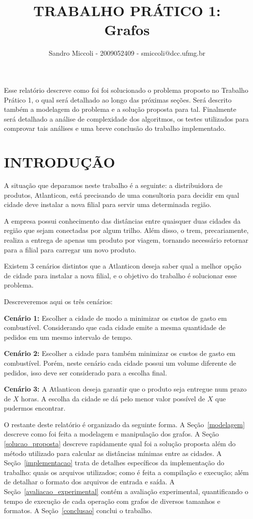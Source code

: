 \documentclass[12pt]{article}
\title{TRABALHO PRÁTICO 1: \\ Grafos}
\author{Sandro Miccoli - 2009052409 - smiccoli@dcc.ufmg.br}
\begin{document}
\maketitle

\begin{resumo}
Esse relatório descreve como foi foi solucionado o problema proposto no Trabalho Prático 1, o qual será detalhado ao longo das próximas seções. Será descrito também a modelagem do problema e a solução proposta para tal. Finalmente será detalhado a análise de complexidade dos algoritmos, os testes utilizados para comprovar tais análises e uma breve conclusão do trabalho implementado.
\end{resumo}

\section{INTRODUÇÃO}

	A situação que deparamos neste trabalho é a seguinte: a distribuidora de produtos, Atlanticon, está precisando de uma consultoria para decidir em qual cidade deve instalar a nova filial para servir uma determinada região.

	A empresa possui conhecimento das distâncias entre quaisquer duas cidades da região que sejam conectadas por algum trilho. Além disso, o trem, precariamente, realiza a entrega de apenas um produto por viagem, tornando necessário retornar para a filial para carregar um novo produto.

	Existem 3 cenários distintos que a Atlanticon deseja saber qual a melhor opção de cidade para instalar a nova filial, e o objetivo do trabalho é solucionar esse problema.

	Descreveremos aqui os três cenários:

	\textbf{Cenário 1: } Escolher a cidade de modo a minimizar os custos de gasto em combustível. Considerando que cada cidade emite a mesma quantidade de pedidos em um mesmo intervalo de tempo.

	\textbf{Cenário 2: } Escolher a cidade para também minimizar os custos de gasto em combustível. Porém, neste cenário cada cidade possui um volume diferente de pedidos, isso deve ser considerado para a escolha final.

	\textbf{Cenário 3: } A Atlanticon deseja garantir que o produto seja entregue num prazo de $X$ horas. A escolha da cidade se dá pelo menor valor possível de $X$ que pudermos encontrar.

	O restante deste relatório é organizado da seguinte forma. A Seção~\ref{modelagem} descreve como foi feita a modelagem e manipulação dos grafos. A Seção \ref{solucao_proposta} descreve rapidamente qual foi a solução proposta além do método utilizado para calcular as distâncias mínimas entre as cidades. A Seção~\ref{implementacao} trata de detalhes específicos da implementação do trabalho: quais os arquivos utilizados; como é feita a compilação e execução; além de detalhar o formato dos arquivos de entrada e saída. A Seção~\ref{avaliacao_experimental} contém a avaliação experimental, quantificando o tempo de execução de cada operação com grafos de diversos tamanhos e formatos. A Seção~\ref{conclusao} conclui o trabalho.
\end{document}
